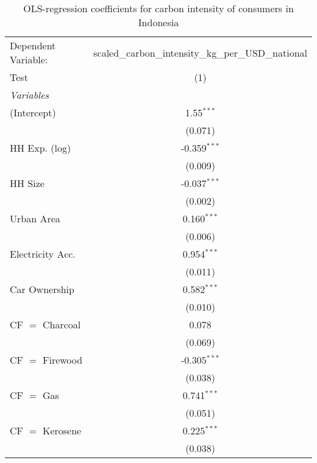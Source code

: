 
\begin{table}[htbp!]
   \centering
   \small
   \begin{adjustbox}{width = 1\textwidth, max height = 0.95\textheight, center}
      \begin{threeparttable}[b]
         \caption{\label{tab:OLS_1_IDN} OLS-regression coefficients for carbon intensity of consumers in Indonesia}
         \begin{tabular}{lc}
            \tabularnewline \midrule \midrule
            Dependent Variable: & scaled\_carbon\_intensity\_kg\_per\_USD\_national\\        
            Test                & (1)\\  
            \midrule
            \emph{Variables}\\
            (Intercept)         & 1.55$^{***}$\\   
                                & (0.071)\\   
            HH Exp. (log)       & -0.359$^{***}$\\   
                                & (0.009)\\   
            HH Size             & -0.037$^{***}$\\   
                                & (0.002)\\   
            Urban Area          & 0.160$^{***}$\\   
                                & (0.006)\\   
            Electricity Acc.    & 0.954$^{***}$\\   
                                & (0.011)\\   
            Car Ownership       & 0.582$^{***}$\\   
                                & (0.010)\\   
            CF $=$ Charcoal     & 0.078\\   
                                & (0.069)\\   
            CF $=$ Firewood     & -0.305$^{***}$\\   
                                & (0.038)\\   
            CF $=$ Gas          & 0.741$^{***}$\\   
                                & (0.051)\\   
            CF $=$ Kerosene     & 0.225$^{***}$\\   
                                & (0.038)\\   

\end{tabular}
\end{threeparttable}
\end{adjustbox}
\end{table}
